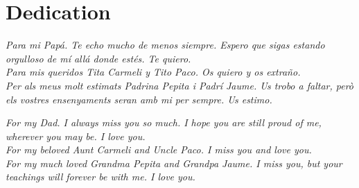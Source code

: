 \chapter*{Dedication} %

\textit{Para mi Papá. Te echo mucho de menos siempre. Espero que sigas estando orgulloso de mí allá donde estés. Te quiero.}\\[0.25cm]

\noindent\textit{Para mis queridos Tita Carmeli y Tito Paco. Os quiero y os extraño.}\\[0.25cm]

\noindent\textit{Per als meus molt estimats Padrina Pepita i Padrí Jaume. Us trobo a faltar, però els vostres ensenyaments seran amb mi per sempre. Us estimo.}\\[0.25cm]

\vspace{+60pt}

\noindent\textit{For my Dad. I always miss you so much. I hope you are still proud of me, wherever you may be. I love you.}\\[0.25cm]

\noindent\textit{For my beloved Aunt Carmeli and Uncle Paco. I miss you and love you.}\\[0.25cm]

\noindent\textit{For my much loved Grandma Pepita and Grandpa Jaume. I miss you, but your teachings will forever be with me. I love you.}\\[0.25cm]
